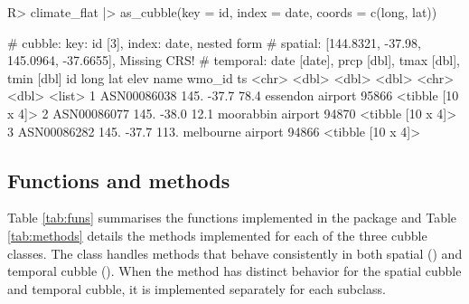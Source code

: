\documentclass[
  shortnames]{jss}
\begin{document}
\begin{CodeChunk}
\begin{CodeInput}
R> climate_flat |> as_cubble(key = id, index = date, coords = c(long, lat))
\end{CodeInput}
\begin{CodeOutput}
# cubble:   key: id [3], index: date, nested form
# spatial:  [144.8321, -37.98, 145.0964, -37.6655], Missing CRS!
# temporal: date [date], prcp [dbl], tmax [dbl], tmin [dbl]
  id           long   lat  elev name              wmo_id ts               
  <chr>       <dbl> <dbl> <dbl> <chr>              <dbl> <list>           
1 ASN00086038  145. -37.7  78.4 essendon airport   95866 <tibble [10 x 4]>
2 ASN00086077  145. -38.0  12.1 moorabbin airport  94870 <tibble [10 x 4]>
3 ASN00086282  145. -37.7 113.  melbourne airport  94866 <tibble [10 x 4]>
\end{CodeOutput}
\end{CodeChunk}

\hypertarget{functions-and-methods}{%
\subsection{Functions and methods}\label{functions-and-methods}}

Table \ref{tab:funs} summarises the functions implemented in the  package and Table \ref{tab:methods} details the methods implemented for each of the three cubble classes. The  class handles methods that behave consistently in both spatial () and temporal cubble (). When the method has distinct behavior for the spatial cubble and temporal cubble, it is implemented separately for each subclass.
\end{document}
